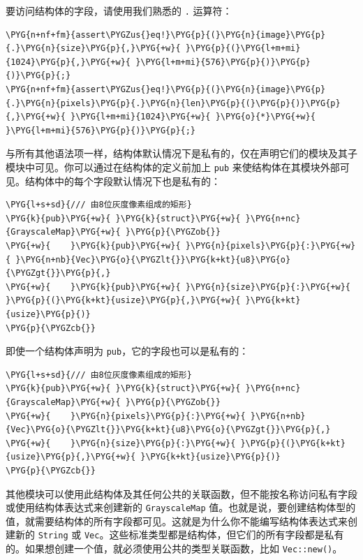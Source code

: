 要访问结构体的字段，请使用我们熟悉的 \texttt{.} 运算符：

\begin{Verbatim}[commandchars=\\\{\},breaklines=true,breakanywhere=true,fontsize=\codefont,xleftmargin=17bp]
\PYG{n+nf+fm}{assert\PYGZus{}eq!}\PYG{p}{(}\PYG{n}{image}\PYG{p}{.}\PYG{n}{size}\PYG{p}{,}\PYG{+w}{ }\PYG{p}{(}\PYG{l+m+mi}{1024}\PYG{p}{,}\PYG{+w}{ }\PYG{l+m+mi}{576}\PYG{p}{)}\PYG{p}{)}\PYG{p}{;}
\PYG{n+nf+fm}{assert\PYGZus{}eq!}\PYG{p}{(}\PYG{n}{image}\PYG{p}{.}\PYG{n}{pixels}\PYG{p}{.}\PYG{n}{len}\PYG{p}{(}\PYG{p}{)}\PYG{p}{,}\PYG{+w}{ }\PYG{l+m+mi}{1024}\PYG{+w}{ }\PYG{o}{*}\PYG{+w}{ }\PYG{l+m+mi}{576}\PYG{p}{)}\PYG{p}{;}
\end{Verbatim}

与所有其他语法项一样，结构体默认情况下是私有的，仅在声明它们的模块及其子模块中可见。你可以通过在结构体的定义前加上 \texttt{pub} 来使结构体在其模块外部可见。结构体中的每个字段默认情况下也是私有的：

\begin{Verbatim}[commandchars=\\\{\},breaklines=true,breakanywhere=true,fontsize=\codefont,xleftmargin=17bp]
\PYG{l+s+sd}{/// 由8位灰度像素组成的矩形}
\PYG{k}{pub}\PYG{+w}{ }\PYG{k}{struct}\PYG{+w}{ }\PYG{n+nc}{GrayscaleMap}\PYG{+w}{ }\PYG{p}{\PYGZob{}}
\PYG{+w}{    }\PYG{k}{pub}\PYG{+w}{ }\PYG{n}{pixels}\PYG{p}{:}\PYG{+w}{ }\PYG{n+nb}{Vec}\PYG{o}{\PYGZlt{}}\PYG{k+kt}{u8}\PYG{o}{\PYGZgt{}}\PYG{p}{,}
\PYG{+w}{    }\PYG{k}{pub}\PYG{+w}{ }\PYG{n}{size}\PYG{p}{:}\PYG{+w}{ }\PYG{p}{(}\PYG{k+kt}{usize}\PYG{p}{,}\PYG{+w}{ }\PYG{k+kt}{usize}\PYG{p}{)}
\PYG{p}{\PYGZcb{}}
\end{Verbatim}

即使一个结构体声明为 \texttt{pub}，它的字段也可以是私有的：

\begin{Verbatim}[commandchars=\\\{\},breaklines=true,breakanywhere=true,fontsize=\codefont,xleftmargin=17bp]
\PYG{l+s+sd}{/// 由8位灰度像素组成的矩形}
\PYG{k}{pub}\PYG{+w}{ }\PYG{k}{struct}\PYG{+w}{ }\PYG{n+nc}{GrayscaleMap}\PYG{+w}{ }\PYG{p}{\PYGZob{}}
\PYG{+w}{    }\PYG{n}{pixels}\PYG{p}{:}\PYG{+w}{ }\PYG{n+nb}{Vec}\PYG{o}{\PYGZlt{}}\PYG{k+kt}{u8}\PYG{o}{\PYGZgt{}}\PYG{p}{,}
\PYG{+w}{    }\PYG{n}{size}\PYG{p}{:}\PYG{+w}{ }\PYG{p}{(}\PYG{k+kt}{usize}\PYG{p}{,}\PYG{+w}{ }\PYG{k+kt}{usize}\PYG{p}{)}
\PYG{p}{\PYGZcb{}}
\end{Verbatim}

其他模块可以使用此结构体及其任何公共的关联函数，但不能按名称访问私有字段或使用结构体表达式来创建新的 \texttt{GrayscaleMap} 值。也就是说，要创建结构体型的值，就需要结构体的所有字段都可见。这就是为什么你不能编写结构体表达式来创建新的 \texttt{String} 或 \texttt{Vec}。这些标准类型都是结构体，但它们的所有字段都是私有的。如果想创建一个值，就必须使用公共的类型关联函数，比如 \texttt{Vec::new()}。

